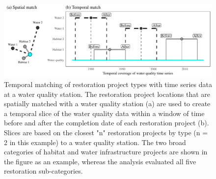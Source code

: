 \documentclass[]{article}
\begin{document}
\clearpage

\begin{figure}
\centerline{\includegraphics[width = \textwidth]{figs/tmmtch.pdf}}
\caption{Temporal matching of restoration project types with time series data at a water quality station.  The restoration project locations that are spatially matched with a water quality station (a) are used to create a temporal slice of the water quality data within a window of time before and after the completion date of each restoration project (b).  Slices are based on the closest "n" restoration projects by type (n = 2 in this example) to a water quality station.  The two broad categories of habitat and water infrastructure projects are shown in the figure as an example, whereas the analysis evaluated all five restoration sub-categories.}
\label{fig:tmmtch}
\end{figure}

\clearpage
\end{document}
